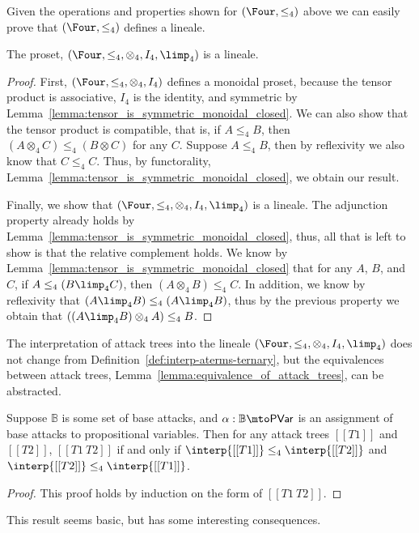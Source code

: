 Given the operations and properties shown for $(\Four, \leq_4)$ above
we can easily prove that $(\Four, \leq_4)$ defines a lineale.
\begin{lemma}
  \label{lemma:four_is_a_lineale}
  The proset, $(\Four, \leq_4, \otimes_4, I_4, \limp_4)$ is a lineale.
\end{lemma}
\begin{proof}
  First, $(\Four, \leq_4, \otimes_4, I_4)$ defines a monoidal proset,
  because the tensor product is associative, $I_4$ is the identity,
  and symmetric by
  Lemma~\ref{lemma:tensor_is_symmetric_monoidal_closed}.  We can also
  show that the tensor product is compatible, that is, if $A \leq_4
  B$, then $(A \otimes_4 C) \leq_4 (B \otimes C)$ for any $C$.
  Suppose $A \leq_4 B$, then by reflexivity we also know that $C
  \leq_4 C$.  Thus, by functorality,
  Lemma~\ref{lemma:tensor_is_symmetric_monoidal_closed}, we obtain our
  result.

  Finally, we show that $(\Four, \leq_4, \otimes_4, I_4, \limp_4)$ is
  a lineale.  The adjunction property already holds by
  Lemma~\ref{lemma:tensor_is_symmetric_monoidal_closed}, thus, all
  that is left to show is that the relative complement holds. We know
  by Lemma~\ref{lemma:tensor_is_symmetric_monoidal_closed} that for
  any $A$, $B$, and $C$, if $A \leq_4 (B \limp_4 C)$, then $(A
  \otimes_4 B) \leq_4 C$.  In addition, we know by reflexivity that
  $(A \limp_4 B) \leq_4 (A \limp_4 B)$, thus by the previous property we obtain
  that $((A \limp_4 B) \otimes_4 A) \leq_4 B$.
\end{proof}

The interpretation of attack trees into the lineale $(\Four, \leq_4,
\otimes_4, I_4, \limp_4)$ does not change from
Definition~\ref{def:interp-aterms-ternary}, but the equivalences
between attack trees, Lemma~\ref{lemma:equivalence_of_attack_trees},
can be abstracted.
\begin{lemma}
  \label{lemma:equivalence_of_attack_trees_lineale}
  Suppose $\mathbb{B}$ is some set of base attacks, and $\alpha :
  \mathbb{B} \mto \mathsf{PVar}$ is an assignment of base attacks to
  propositional variables.  Then for any attack trees $[[T1]]$ and
  $[[T2]]$, $[[T1 ~ T2]]$ if and only if $\interp{[[T1]]} \leq_4 \interp{[[T2]]}$ and
  $\interp{[[T2]]} \leq_4 \interp{[[T1]]}$.
\end{lemma}
\begin{proof}
  This proof holds by induction on the form of $[[T1 ~ T2]]$.
\end{proof}
This result seems basic, but has some interesting consequences.

